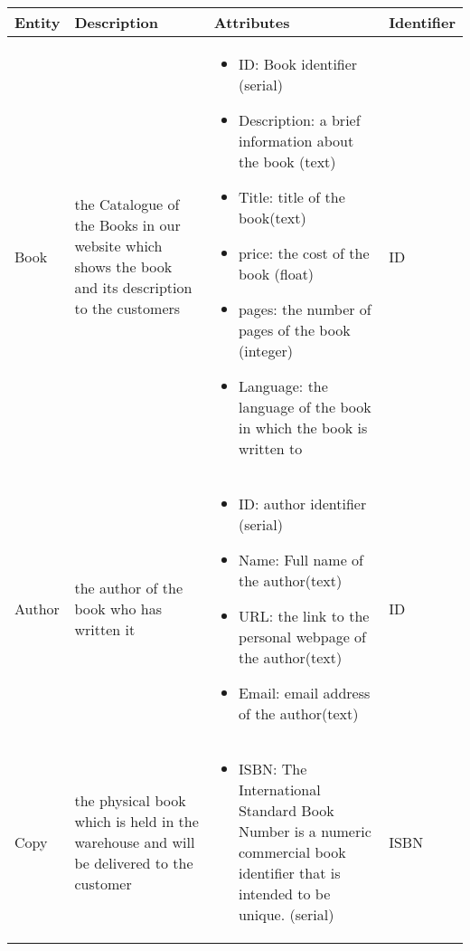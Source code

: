 \begin{longtable}{|p{}|p{} |p{}|p{} |} 
\hline
\textbf{Entity} & \textbf{Description} & \textbf{Attributes} & \textbf{Identifier}  \\\hline


Book & the Catalogue of the Books in our website which shows the book and its description to the customers & \begin{itemize}
        \vspace{-1em}
        \item ID: Book identifier (serial)
         \item Description: a brief information about the book (text)
        \item Title: title of the book(text)
        \item price: the cost of the book (float)
        \item pages: the number of pages of the book (integer)
        \item Language: the language of the book in which the book is written to



    \end{itemize}
 &  ID\\\hline
 
Author & the author of the book who has written it & \begin{itemize}
        \vspace{-1em}
        \item ID: author identifier (serial)
        \item Name: Full name of the author(text)
        \item URL: the link to the personal webpage of the author(text)
        \item Email: email address of the author(text)
    \end{itemize}
 &  ID \\\hline
 
 
  Copy & the physical book which is held in the warehouse and will be delivered to the customer & \begin{itemize}
        \vspace{-1em}
        \item ISBN: The International Standard Book Number is a numeric commercial book identifier that is intended to be unique. (serial)
        
    \end{itemize}
 &  ISBN \\\hline
 

\end{longtable}
